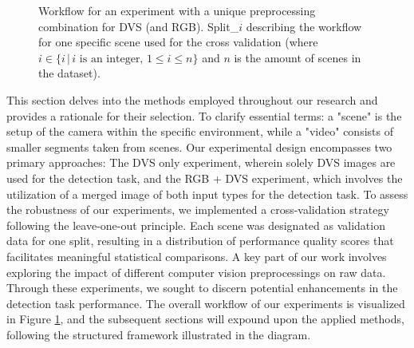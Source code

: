 \documentclass[sigchi,screen]{acmart}
\begin{document}
\begin{figure}[H]

\caption{Workflow for an experiment with a unique preprocessing combination for DVS (and RGB). Split\_$i$ describing the workflow for one specific scene used for the cross validation (where $i \in\{ i \,|\, i \text{ is an integer, } 1 \leq i \leq n \}$ and $n$ is the amount of scenes in the dataset).}
\label{fig:workflow}
\end{figure}

This section delves into the methods employed throughout our research and provides a rationale for their selection. To clarify essential terms: a "scene" is the setup of the camera within the specific environment, while a "video" consists of smaller segments taken from scenes. Our experimental design encompasses two primary approaches: The DVS only experiment, wherein solely DVS images are used for the detection task, and the RGB + DVS experiment, which involves the utilization of a merged image of both input types for the detection task. To assess the robustness of our experiments, we implemented a cross-validation strategy following the leave-one-out principle. Each scene was designated as validation data for one split, resulting in a distribution of performance quality scores that facilitates meaningful statistical comparisons. A key part of our work involves exploring the impact of different computer vision preprocessings on raw data. Through these experiments, we sought to discern potential enhancements in the detection task performance. The overall workflow of our experiments is visualized in Figure \ref{fig:workflow}, and the subsequent sections will expound upon the applied methods, following the structured framework illustrated in the diagram.
\end{document}
